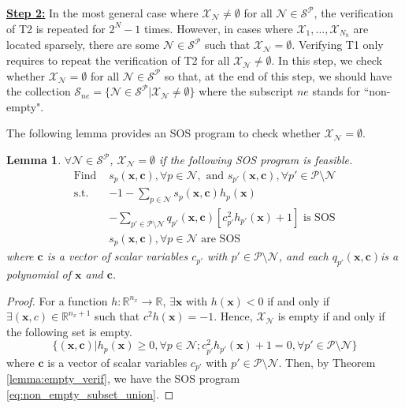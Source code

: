 \documentclass[letterpaper, 10 pt, conference]{ieeeconf}  %
\newtheorem{lemma}{Lemma}
\begin{document}
\textbf{\underline{Step 2:}} In the most general case where $\mathcal{X}_{\mathcal{N}}\neq\emptyset$ for all $\mathcal{N}\in\mathcal{S}^{\mathcal{P}}$, the verification of T2 is repeated for $2^N-1$ times. However, in cases where $\mathcal{X}_1,...,\mathcal{X}_{N_h}$ are located sparsely, there are some $\mathcal{N}\in\mathcal{S}^{\mathcal{P}}$ such that $\mathcal{X}_{\mathcal{N}}=\emptyset$. Verifying T1 only requires to repeat the verification of T2 for all $\mathcal{X}_{\mathcal{N}}\neq\emptyset$. In this step, we check whether $\mathcal{X}_{\mathcal{N}} = \emptyset$ for all $\mathcal{N}\in\mathcal{S}^{\mathcal{P}}$ so that, at the end of this step, we should have the collection $\mathcal{S}_{ne} = \{\mathcal{N}\in\mathcal{S}^{\mathcal{P}}|\mathcal{X}_{\mathcal{N}}\neq\emptyset\}$ where the subscript $ne$ stands for ``non-empty". 

The following lemma provides an SOS program to check whether $\mathcal{X}_{\mathcal{N}}=\emptyset$.
\begin{lemma}
\label{lemma:non_empty_subset_union}
    $\forall \mathcal{N}\in\mathcal{S}^{\mathcal{P}}$, $\mathcal{X}_{\mathcal{N}} = \emptyset$ if the following SOS program is feasible.
    \begin{subequations}
    \label{eq:non_empty_subset_union}
    \begin{align}
        \text{Find } & s_p(\mathbf{x}, \mathbf{c}), \forall p\in\mathcal{N}, \text{ and }s_{p'}(\mathbf{x}, \mathbf{c}), \forall p'\in\mathcal{P}\setminus\mathcal{N}\\
        \text{s.t. } & -1 - \sum_{p\in\mathcal{N}}s_p(\mathbf{x},\mathbf{c})h_p(\mathbf{x}) \nonumber\\
        &-\sum_{p'\in\mathcal{P}\setminus\mathcal{N}}q_{p'}(\mathbf{x}, \mathbf{c})[c_{p'}^2h_{p'}(\mathbf{x})+1] \text{ is SOS}\\
        &s_p(\mathbf{x}, \mathbf{c}), \forall p\in\mathcal{N} \text{ are SOS}
    \end{align}
    \end{subequations}
    where $\mathbf{c}$ is a vector of scalar variables $c_{p'}$ with $ p'\in\mathcal{P}\setminus\mathcal{N}$, and each $q_{p'}(\mathbf{x},\mathbf{c})$is a polynomial of $\mathbf{x}$ and $\mathbf{c}$. 
\end{lemma}
\begin{proof}
    For a function $h:\mathbb{R}^{n_x}\rightarrow\mathbb{R}$, $\exists \mathbf{x}$ with $h(\mathbf{x})<0$ if and only if $\exists (\mathbf{x}, c)\in\mathbb{R}^{n_x+1}$ such that $c^2h(\mathbf{x})=-1$. Hence, $\mathcal{X}_{\mathcal{N}}$ is empty if and only if the following set is empty.
    \begin{equation*}
        \{(\mathbf{x},\mathbf{c})|h_p(\mathbf{x})\geq 0, \forall p\in\mathcal{N}; c^2_{p'}h_{p'}(\mathbf{x}) + 1=0, \forall p'\in\mathcal{P}\setminus\mathcal{N}\}
    \end{equation*}
    where $\mathbf{c}$ is a vector of scalar variables $c_{p'}$ with $ p'\in\mathcal{P}\setminus\mathcal{N}$. Then, by Theorem \ref{lemma:empty_verif}, we have the SOS program \eqref{eq:non_empty_subset_union}.
\end{proof}
\end{document}
